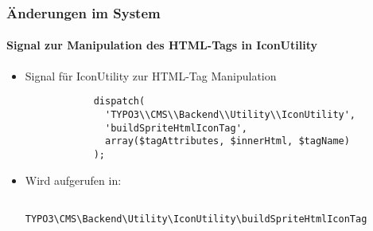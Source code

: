 \begin{frame}[fragile]
	\frametitle{Änderungen im System}
	\framesubtitle{Signal zur Manipulation des HTML-Tags in IconUtility}

	\begin{itemize}
		\item Signal für IconUtility zur HTML-Tag Manipulation
		\begin{lstlisting}
			dispatch(
			  'TYPO3\\CMS\\Backend\\Utility\\IconUtility',
			  'buildSpriteHtmlIconTag',
			  array($tagAttributes, $innerHtml, $tagName)
			);
		\end{lstlisting}

		\item Wird aufgerufen in:

		\begin{lstlisting}
			TYPO3\CMS\Backend\Utility\IconUtility\buildSpriteHtmlIconTag
		\end{lstlisting}

	\end{itemize}

\end{frame}


